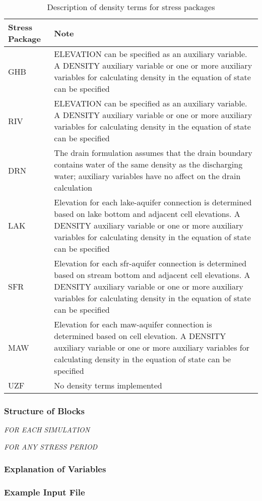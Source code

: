 \begin{longtable}{p{3cm} p{12cm}}
\caption{Description of density terms for stress packages}
\tabularnewline
\hline
\hline
\textbf{Stress Package} & \textbf{Note} \\
\hline
\endhead
\hline
\endfoot
GHB & ELEVATION can be specified as an auxiliary variable.  A DENSITY auxiliary variable or one or more auxiliary variables for calculating density in the equation of state can be specified \\
RIV & ELEVATION can be specified as an auxiliary variable.  A DENSITY auxiliary variable or one or more auxiliary variables for calculating density in the equation of state can be specified \\
DRN & The drain formulation assumes that the drain boundary contains water of the same density as the discharging water; auxiliary variables have no affect on the drain calculation  \\
LAK & Elevation for each lake-aquifer connection is determined based on lake bottom and adjacent cell elevations. A DENSITY auxiliary variable or one or more auxiliary variables for calculating density in the equation of state can be specified \\
SFR & Elevation for each sfr-aquifer connection is determined based on stream bottom and adjacent cell elevations. A DENSITY auxiliary variable or one or more auxiliary variables for calculating density in the equation of state can be specified \\
MAW & Elevation for each maw-aquifer connection is determined based on cell elevation. A DENSITY auxiliary variable or one or more auxiliary variables for calculating density in the equation of state can be specified \\
UZF & No density terms implemented \\
\end{longtable}

\vspace{5mm}
\subsubsection{Structure of Blocks}

\vspace{5mm}
\noindent \textit{FOR EACH SIMULATION}



\vspace{5mm}
\noindent \textit{FOR ANY STRESS PERIOD}


\vspace{5mm}
\subsubsection{Explanation of Variables}
\begin{description}

\end{description}

\vspace{5mm}
\subsubsection{Example Input File}


